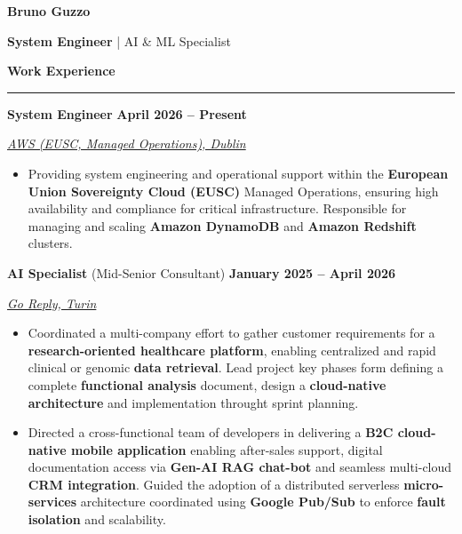 \documentclass[9pt, a4paper]{article}
\newcommand{\cvsection}[1]{%
	\vspace{2pt}\par
	{\Large\bfseries\color{sectionblue}#1}\par
	\vspace{2pt}\hrule\vspace{6pt}
}
\newcommand{\jobsection}[3]{%
	\par {\large #1} \hfill {\bfseries #2} \par {\textit{#3}} \vspace{4pt}
}
\begin{document}
	
	\begin{center}
		{\Huge\bfseries Bruno Guzzo}\par
		\vspace{4pt}
		{\Large \textbf{System Engineer} | AI \& ML Specialist}
	\end{center}
	
	\begin{minipage}[t]{0.65\linewidth}
		\vspace{0pt} %
		
		\cvsection{Work Experience}
		
		\jobsection{\textbf{System Engineer}}{April 2026 -- Present}{\href{https://aws.amazon.com/}{AWS (EUSC, Managed Operations), Dublin}}
		\begin{itemize}[leftmargin=*, nosep]
			\item \footnotesize Providing system engineering and operational support within the \textbf{European Union Sovereignty Cloud (EUSC)} Managed Operations, ensuring high availability and compliance for critical infrastructure. Responsible for managing and scaling \textbf{Amazon DynamoDB} and \textbf{Amazon Redshift} clusters.
		\end{itemize}
		
		\vspace{7pt}
		\jobsection{\textbf{AI Specialist} (Mid-Senior Consultant)}{January 2025 -- April 2026}{\href{https://www.reply.com/go-reply/en}{Go Reply, Turin}}
		
		\begin{itemize}[leftmargin=*, nosep]
			\item \footnotesize Coordinated a multi-company effort to gather customer requirements for a \textbf{research-oriented healthcare platform}, enabling centralized and rapid clinical or genomic \textbf{data retrieval}. Lead project key phases form defining a complete \textbf{functional analysis} document, design a \textbf{cloud-native architecture} and implementation throught sprint planning.      
			
			\vspace{5pt}
			\item \footnotesize Directed a cross-functional team of developers in delivering a \textbf{B2C cloud-native mobile application} enabling after-sales support, digital documentation access via \textbf{Gen-AI RAG chat-bot} and seamless multi-cloud \textbf{CRM integration}. Guided the adoption of a distributed serverless \textbf{micro-services} architecture coordinated using \textbf{Google Pub/Sub} to enforce \textbf{fault isolation} and scalability. 
			

\end{itemize}
\end{minipage}
\end{document}

